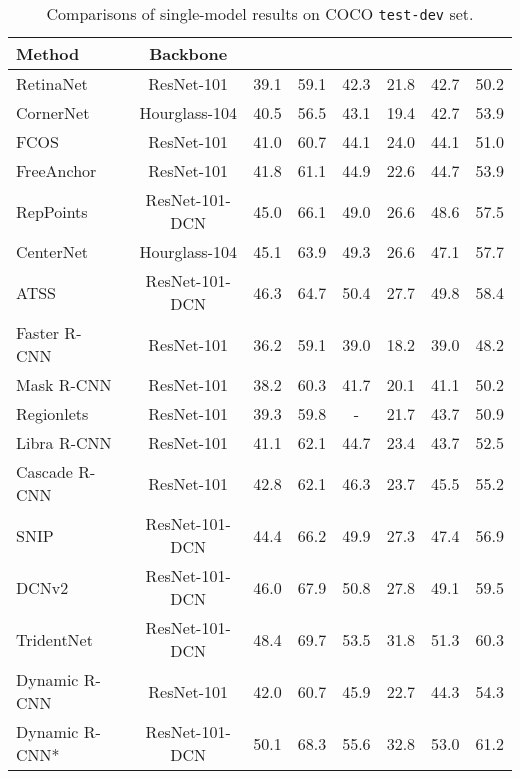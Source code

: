 \documentclass[runningheads]{llncs}
\begin{document}
\begin{table}[!t]
    \caption{Comparisons of single-model results on COCO \texttt{test-dev} set.}
    \label{tab:overall}
    \begin{center}
\setlength{\tabcolsep}{3pt}
\begin{tabular}{lccccccc}
\toprule
Method & Backbone &  &  &  &  &  & \\
\midrule
RetinaNet~\cite{FocalLoss} & ResNet-101 & 39.1 & 59.1 & 42.3 & 21.8 & 42.7 & 50.2\\
CornerNet~\cite{CornerNet} & Hourglass-104 & 40.5 & 56.5 & 43.1 & 19.4 & 42.7 & 53.9\\
FCOS~\cite{FCOS} & ResNet-101 & 41.0 & 60.7 & 44.1 & 24.0 & 44.1 & 51.0\\
FreeAnchor~\cite{FreeAnchor} & ResNet-101 & 41.8 & 61.1 & 44.9 & 22.6 & 44.7 & 53.9\\
RepPoints~\cite{RepPoints} & ResNet-101-DCN & 45.0 & 66.1 & 49.0 & 26.6 & 48.6 & 57.5\\
CenterNet~\cite{CenterNet} & Hourglass-104 & 45.1 & 63.9 & 49.3 & 26.6 & 47.1 & 57.7\\
ATSS~\cite{ATSS} & ResNet-101-DCN & 46.3 & 64.7 & 50.4 & 27.7 & 49.8 & 58.4\\
\midrule
Faster R-CNN~\cite{FPN} & ResNet-101 & 36.2 & 59.1 & 39.0 & 18.2 & 39.0 & 48.2\\
Mask R-CNN~\cite{MaskRCNN} & ResNet-101 & 38.2 & 60.3 & 41.7 & 20.1 & 41.1 & 50.2\\
Regionlets~\cite{Regionlets} & ResNet-101 & 39.3 & 59.8 & - & 21.7 & 43.7 & 50.9\\
Libra R-CNN~\cite{LibraRCNN} & ResNet-101 & 41.1 & 62.1 & 44.7 & 23.4 & 43.7 & 52.5\\
Cascade R-CNN~\cite{CascadeRCNN} & ResNet-101 & 42.8 & 62.1 & 46.3 & 23.7 & 45.5 & 55.2\\
SNIP~\cite{SNIP} & ResNet-101-DCN & 44.4 & 66.2 & 49.9 & 27.3 & 47.4 & 56.9\\
DCNv2~\cite{DCNv2} & ResNet-101-DCN & 46.0 & 67.9 & 50.8 & 27.8 & 49.1 & 59.5\\
TridentNet~\cite{TridentNet} & ResNet-101-DCN & 48.4 & 69.7 & 53.5 & 31.8 & 51.3 & 60.3\\
\midrule
Dynamic R-CNN & ResNet-101 & 42.0 & 60.7 & 45.9 & 22.7 & 44.3 & 54.3\\
Dynamic R-CNN* & ResNet-101-DCN & 50.1 & 68.3 & 55.6 & 32.8 & 53.0 & 61.2\\
\bottomrule
\end{tabular}
\end{center}
 \end{table}
\end{document}
